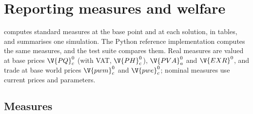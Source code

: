 \chapter{Reporting measures and welfare}\label{chap:reporting}

 computes standard measures at the base point and at each
solution, in tables, and  summarises one simulation.
The Python reference implementation computes the same measures, and the test
suite compares them. Real measures are valued at base prices $\V{PQ}^0_c$
(with VAT, $\V{PH}^0_c$), $\V{PVA}^0_a$ and $\V{EXR}^0$, and trade at base world
prices $\V{pwm}^0_c$ and $\V{pwe}^0_c$; nominal measures use current prices and
parameters.

\section{Measures}\label{sec:measures}

